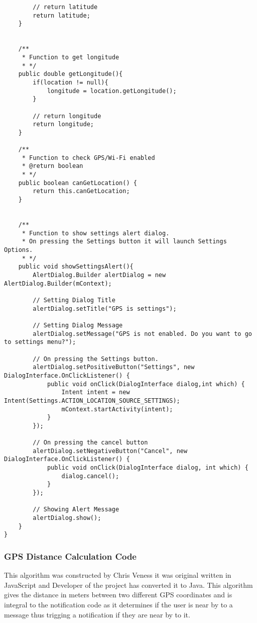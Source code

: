 \begin{lstlisting}
        // return latitude
        return latitude;
    }


    /**
     * Function to get longitude
     * */
    public double getLongitude(){
        if(location != null){
            longitude = location.getLongitude();
        }

        // return longitude
        return longitude;
    }

    /**
     * Function to check GPS/Wi-Fi enabled
     * @return boolean
     * */
    public boolean canGetLocation() {
        return this.canGetLocation;
    }


    /**
     * Function to show settings alert dialog.
     * On pressing the Settings button it will launch Settings Options.
     * */
    public void showSettingsAlert(){
        AlertDialog.Builder alertDialog = new AlertDialog.Builder(mContext);

        // Setting Dialog Title
        alertDialog.setTitle("GPS is settings");

        // Setting Dialog Message
        alertDialog.setMessage("GPS is not enabled. Do you want to go to settings menu?");

        // On pressing the Settings button.
        alertDialog.setPositiveButton("Settings", new DialogInterface.OnClickListener() {
            public void onClick(DialogInterface dialog,int which) {
                Intent intent = new Intent(Settings.ACTION_LOCATION_SOURCE_SETTINGS);
                mContext.startActivity(intent);
            }
        });

        // On pressing the cancel button
        alertDialog.setNegativeButton("Cancel", new DialogInterface.OnClickListener() {
            public void onClick(DialogInterface dialog, int which) {
                dialog.cancel();
            }
        });

        // Showing Alert Message
        alertDialog.show();
    }
}

\end{lstlisting}


\subsubsection{GPS Distance Calculation Code}

This algorithm was constructed by Chris Veness\cite{ChrisVeness:GPSDistance:2010:online} it was original written in JavaScript and Developer of the project has converted it to Java. This algorithm gives the distance in meters between two different GPS coordinates and is integral to the notification code as it determines if the user is near by to a message thus trigging a notification if they are near by to it.

